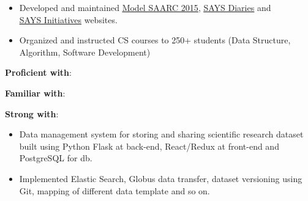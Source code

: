 \documentclass[10pt,a4paper,ragged2e,withhyper]{altacv}
\begin{document}
\begin{paracol}{2}
\begin{itemize}
\item Developed and maintained \href{http://www.says.org.bd/modelsaarc}{\underline{Model SAARC 2015}}, \href{http://says.org.bd/blog/}{\underline{SAYS Diaries}} and\\ \href{http://says.org.bd/initiatives/}{\underline{SAYS Initiatives}} websites. 

\end{itemize}

\divider

\begin{itemize}
\item Organized and instructed CS courses to 250+ students (Data Structure, Algorithm, Software Development)
\end{itemize}



\begin{small}
\textbf{Proficient with}:
          \\
\end{small}

\begin{small}
\textbf{Familiar with}:
       \\
\end{small}


\begin{small}
\textbf{Strong with}:
    
\end{small}
\newpage

\nocite{*}

\switchcolumn

\begin{itemize}
\item  Data management system for storing and sharing scientific research dataset built using Python Flask at back-end, React/Redux at front-end and PostgreSQL for db. 
\item Implemented Elastic Search, Globus data transfer, dataset versioning using Git, mapping of different data template and so on. 
\end{itemize}


\end{paracol}
\end{document}
